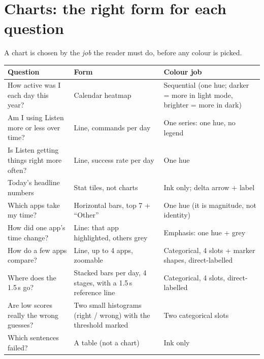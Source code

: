 \documentclass[11pt,a4paper]{article}
\begin{document}
\section{Charts: the right form for each question}

A chart is chosen by the \emph{job} the reader must do, before any colour is picked.

\begin{center}
\renewcommand{\arraystretch}{1.25}
\begin{tabularx}{\textwidth}{>{\raggedright\arraybackslash}p{4.6cm} >{\raggedright\arraybackslash}X >{\raggedright\arraybackslash}p{4.0cm}}
\toprule
\textbf{Question} & \textbf{Form} & \textbf{Colour job} \\
\midrule
How active was I each day this year? & Calendar heatmap & Sequential (one hue; darker = more in light mode, brighter = more in dark) \\
Am I using Listen more or less over time? & Line, commands per day & One series: one hue, no legend \\
Is Listen getting things right more often? & Line, success rate per day & One hue \\
Today's headline numbers & Stat tiles, not charts & Ink only; delta arrow + label \\
Which apps take my time? & Horizontal bars, top 7 + ``Other'' & One hue (it is magnitude, not identity) \\
How did one app's time change? & Line: that app highlighted, others grey & Emphasis: one hue + grey \\
How do a few apps compare? & Line, up to 4 apps, zoomable & Categorical, 4 slots + marker shapes, direct-labelled \\
Where does the 1.5\,s go? & Stacked bars per day, 4 stages, with a 1.5\,s reference line & Categorical, 4 slots, direct-labelled \\
Are low scores really the wrong guesses? & Two small histograms (right / wrong) with the threshold marked & Two categorical slots \\
Which sentences failed? & A table (not a chart) & Ink only \\
\bottomrule
\end{tabularx}
\end{center}
\end{document}

